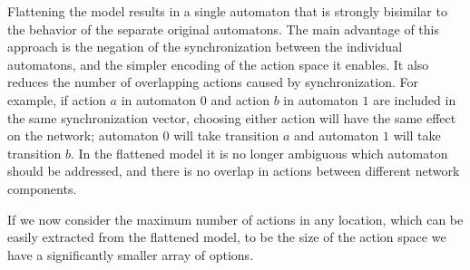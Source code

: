 Flattening the model results in a single automaton that is strongly bisimilar to the behavior of the separate original automatons. The main advantage of this approach is the negation of the synchronization between the individual automatons, and the simpler encoding of the action space it enables. It also reduces the number of overlapping actions caused by synchronization. For example, if action $a$ in automaton $0$ and action $b$ in automaton $1$ are included in the same synchronization vector, choosing either action will have the same effect on the network; automaton $0$ will take transition $a$ and automaton $1$ will take transition $b$. In the flattened model it is no longer ambiguous which automaton should be addressed, and there is no overlap in actions between different network components.

If we now consider the maximum number of actions in any location, which can be easily extracted from the flattened model, to be the size of the action space we have a significantly smaller array of options.

